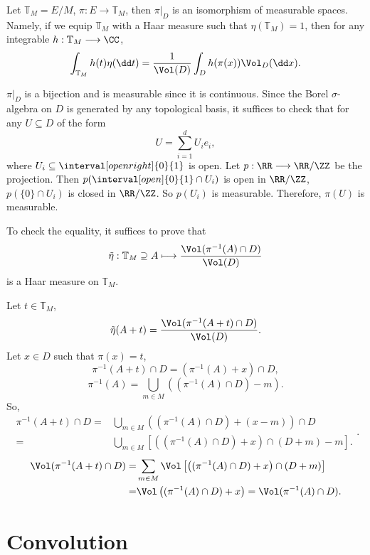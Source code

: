 \begin{propositionenv}
    Let $\mathbb{T}_M = E/M$, $\pi : E \longrightarrow \mathbb{T}_M$, then $\pi|_D$ is an isomorphism of measurable spaces.
    Namely, if we equip $\mathbb{T}_M$ with a Haar measure such that $\eta(\mathbb{T}_M) = 1$, then for any integrable $h : \mathbb{T}_M \longrightarrow \CC$,
    $$\int_{\mathbb{T}_M} h(t) \eta(\dd t) = \frac{1}{\Vol(D)} \int_{D} h(\pi(x)) \Vol_{D}(\dd x).$$
\end{propositionenv}
\begin{proofenv}
    $\pi|_{D}$ is a bijection and is measurable since it is continuous.
    Since the Borel $\sigma$-algebra on $D$ is generated by any topological basis, it suffices to check that for any $U \subseteq D$ of the form
    $$U = \sum_{i=1}^{d} U_i e_i,$$
    where $U_i \subseteq \interval[open right]{0}{1}$ is open.
    Let $p : \RR \longrightarrow \RR/\ZZ$ be the projection.
    Then $p(\interval[open]{0}{1} \cap U_i)$ is open in $\RR/\ZZ$,
    $p(\{0\} \cap U_i)$ is closed in $\RR/\ZZ$.
    So $p(U_i)$ is measurable.
    Therefore, $\pi(U)$ is measurable.

    \quad To check the equality, it suffices to prove that
    $$\tilde{\eta} : \mathbb{T}_M \supseteq A \longmapsto \frac{\Vol(\pi^{-1}(A) \cap D)}{\Vol(D)}$$
    is a Haar measure on $\mathbb{T}_M$.

    \quad Let $t \in \mathbb{T}_M$,
    $$\tilde{\eta}(A + t) = \frac{\Vol(\pi^{-1}(A + t) \cap D)}{\Vol(D)}.$$
    Let $x \in D$ such that $\pi(x) = t$,
    $$\pi^{-1}(A + t) \cap D= (\pi^{-1}(A) + x) \cap D,$$
    $$\pi^{-1}(A) = \bigcup_{m \in M} \left((\pi^{-1}(A) \cap D) - m\right).$$
    So,
    $$\begin{aligned}
        \pi^{-1}(A + t) \cap D = & \bigcup_{m \in M} \left((\pi^{-1}(A) \cap D) + (x - m)\right) \cap D\\
        = & \bigcup_{m \in M} \left[\left((\pi^{-1}(A) \cap D) + x\right) \cap (D + m) - m\right].
    \end{aligned}.$$
    $$\begin{aligned}
        \Vol(\pi^{-1}(A + t) \cap D) = & \sum_{m \in M} \Vol\left[\left((\pi^{-1}(A) \cap D) + x\right) \cap (D + m)\right]\\
        = & \Vol\left((\pi^{-1}(A) \cap D) + x\right) = \Vol(\pi^{-1}(A) \cap D).
    \end{aligned}$$
\end{proofenv}


\section{Convolution}

